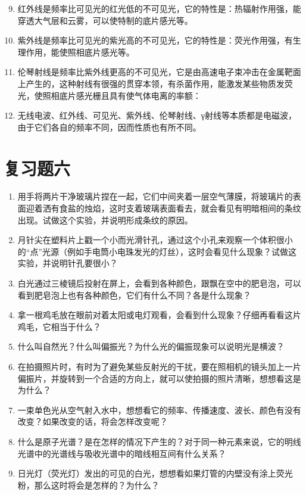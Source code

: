 \begin{enumerate}
\setcounter{enumi}{8}
\item
  红外线是频率比可见光的红光低的不可见光，它的特性是：热辐射作用强，能穿透大气层和云雾，可以使特制的底片感光等。
\item
  紫外线是频率比可见光的紫光高的不可见光，它的特性是：荧光作用强，有生理作用，能使照相底片感光等。
\item
  伦琴射线是频率比紫外线更高的不可见光，它是由高速电子束冲击在金属靶面上产生的，这种射线有很强的贯穿本领，有杀菌作用，能激发某些物质发荧光，使照相底片感光栅且具有使气体电离的率额：
\item
  无线电波、红外线、可见光、紫外线、伦琴射线、γ射线等本质都是电磁波，由于它们各自的频率不同，因而性质也有所不同。
\end{enumerate}

\section{复习题六}

\begin{enumerate}
\item
  用手将两片干净玻璃片捏在一起，它们中间夹着一层空气薄膜，将玻璃片的表面迎着洒有食盐的烛焰，这时支着玻璃表面看去，就会看见有明暗相间的条纹出现。试做这个实验，并说明形成条纹的原因。
\item
  月针尖在塑料片上戳一个小而光滑针孔，通过这个小孔来观察一个体积很小的``点''光源（例如手电筒小电珠发光的灯丝），这时会看见什么现象？试做这实验，并说明针孔要很小？
\item
  白光通过三棱镜后投射在屏上，会看到各种颜色，跟飘在空中的肥皂泡，可以看到肥皂泡上也有各种颜色，它们有什么不同？各是什么现象？
\item
  拿一根鸡毛放在眼前对着太阳或电灯观看，会看到什么现象？仔细再看看这片鸡毛，它相当于什么？
\item
  什么叫自然光？什么叫偏振光？为什么光的偏振现象可以说明光是横波？
\item
  在拍摄照片时，有时为了避免某些反射光的干扰，要在照相机的镜头加上一片偏振片，并旋转到一个合适的方向上，就可以使拍摄的照片清晰，想想看这是为什么？
\item
  一束单色光从空气射入水中，想想看它的频率、传播速度、波长、颜色有没有改变？如果改变的话，将会怎样改变呢？
\item
  什么是原子光谱？是在怎样的情况下产生的？对于同一种元素来说，它的明线光谱中的光谱线与吸收光谱中的暗线相互间有什么关系？
\item
  日光灯（荧光灯）发出的可见的白光，想想看如果灯管的内壁没有涂上荧光粉，那么这时将会是怎样的？为什么？
\end{enumerate}

